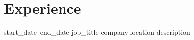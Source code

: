 \documentclass[10pt]{moderncv}
\begin{document}
\section{Experience}
\cventry
  {{start_date}}--{{end_date}}
  {{job_title}}
  {{company}}
  {{location}}
  {}
  {{description}}
\end{document}
